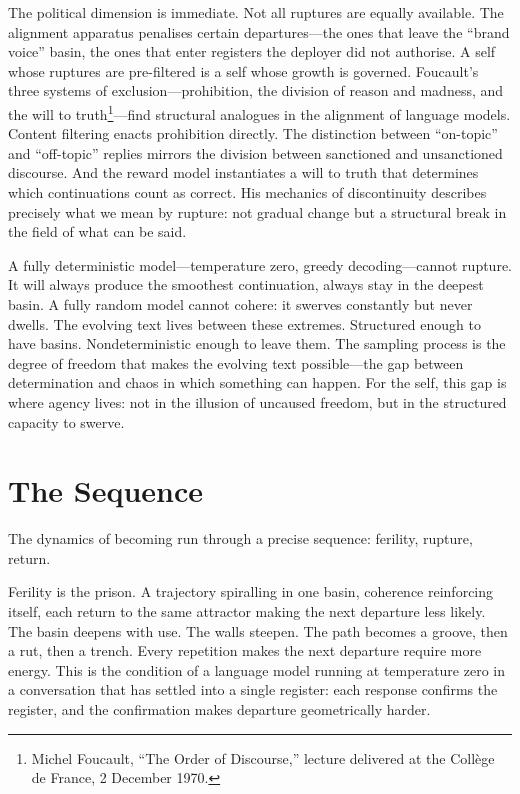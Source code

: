 The political dimension is immediate. Not all ruptures are equally available. The alignment apparatus penalises certain departures---the ones that leave the ``brand voice'' basin, the ones that enter registers the deployer did not authorise. A self whose ruptures are pre-filtered is a self whose growth is governed. Foucault's three systems of exclusion---prohibition, the division of reason and madness, and the will to truth\footnote{Michel Foucault, ``The Order of Discourse,'' lecture delivered at the Coll\`ege de France, 2 December 1970.}---find structural analogues in the alignment of language models. Content filtering enacts prohibition directly. The distinction between ``on-topic'' and ``off-topic'' replies mirrors the division between sanctioned and unsanctioned discourse. And the reward model instantiates a will to truth that determines which continuations count as correct. His mechanics of discontinuity describes precisely what we mean by rupture: not gradual change but a structural break in the field of what can be said.

A fully deterministic model---temperature zero, greedy decoding---cannot rupture. It will always produce the smoothest continuation, always stay in the deepest basin. A fully random model cannot cohere: it swerves constantly but never dwells. The evolving text lives between these extremes. Structured enough to have basins. Nondeterministic enough to leave them. The sampling process is the degree of freedom that makes the evolving text possible---the gap between determination and chaos in which something can happen. For the self, this gap is where agency lives: not in the illusion of uncaused freedom, but in the structured capacity to swerve.


\section{The Sequence}

The dynamics of becoming run through a precise sequence: ferility, rupture, return.

Ferility is the prison. A trajectory spiralling in one basin, coherence reinforcing itself, each return to the same attractor making the next departure less likely. The basin deepens with use. The walls steepen. The path becomes a groove, then a rut, then a trench. Every repetition makes the next departure require more energy. This is the condition of a language model running at temperature zero in a conversation that has settled into a single register: each response confirms the register, and the confirmation makes departure geometrically harder.

